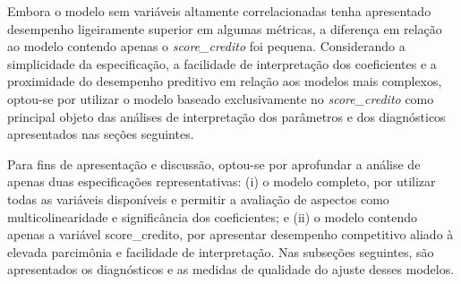\documentclass[
  brazilian,
  12pt,
  letterpaper,
  DIV=11,
  numbers=noendperiod]{scrartcl}
\begin{document}
Embora o modelo sem variáveis altamente correlacionadas tenha
apresentado desempenho ligeiramente superior em algumas métricas, a
diferença em relação ao modelo contendo apenas o \emph{score\_credito}
foi pequena. Considerando a simplicidade da especificação, a facilidade
de interpretação dos coeficientes e a proximidade do desempenho
preditivo em relação aos modelos mais complexos, optou-se por utilizar o
modelo baseado exclusivamente no \emph{score\_credito} como principal
objeto das análises de interpretação dos parâmetros e dos diagnósticos
apresentados nas seções seguintes.

Para fins de apresentação e discussão, optou-se por aprofundar a análise
de apenas duas especificações representativas: (i) o modelo completo,
por utilizar todas as variáveis disponíveis e permitir a avaliação de
aspectos como multicolinearidade e significância dos coeficientes; e
(ii) o modelo contendo apenas a variável score\_credito, por apresentar
desempenho competitivo aliado à elevada parcimônia e facilidade de
interpretação. Nas subseções seguintes, são apresentados os diagnósticos
e as medidas de qualidade do ajuste desses modelos.
\end{document}
